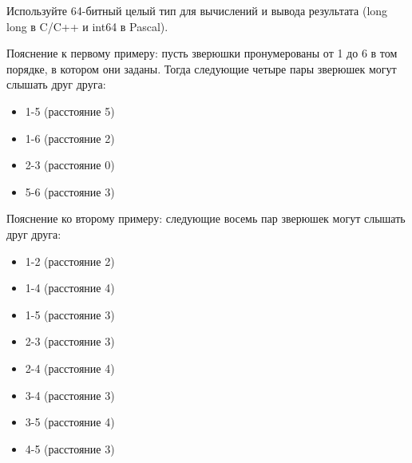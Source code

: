 Используйте 64-битный целый тип для вычислений и вывода результата (long long в
C/C++ и int64 в Pascal). 

Пояснение к первому примеру: пусть зверюшки пронумерованы от 1 до 6 в том порядке, в котором они
заданы. Тогда следующие четыре пары зверюшек могут слышать друг друга:
\begin{itemize}
\item 1-5 (расстояние 5)
\item 1-6 (расстояние 2)
\item 2-3 (расстояние 0)
\item 5-6 (расстояние 3)
\end{itemize}

Пояснение ко второму примеру: следующие восемь пар зверюшек могут слышать друг друга:
\begin{itemize}
\item 1-2 (расстояние 2)
\item 1-4 (расстояние 4)
\item 1-5 (расстояние 3)
\item 2-3 (расстояние 3)
\item 2-4 (расстояние 4)
\item 3-4 (расстояние 3)
\item 3-5 (расстояние 4)
\item 4-5 (расстояние 3) 
\end{itemize}